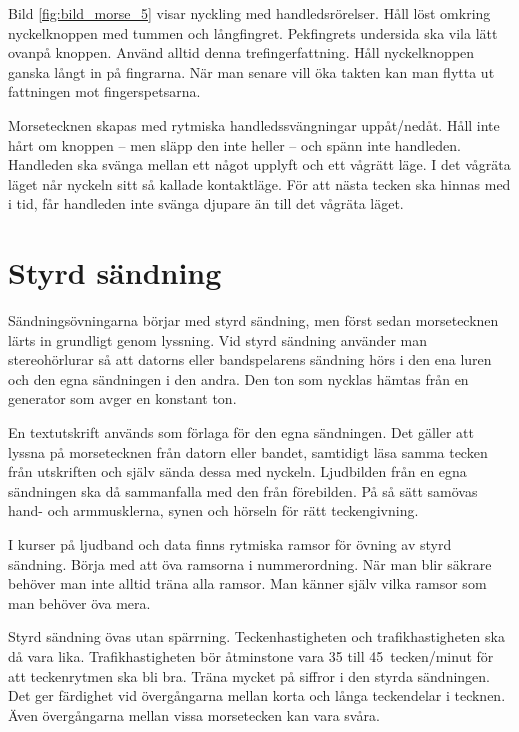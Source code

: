   
Bild \ref{fig:bild_morse_5} visar nyckling med handledsrörelser.
Håll löst omkring nyckelknoppen med tummen och långfingret.
Pekfingrets undersida ska vila lätt ovanpå knoppen.
Använd alltid denna trefingerfattning.
Håll nyckelknoppen ganska långt in på fingrarna.
När man senare vill öka takten kan man flytta ut fattningen mot fingerspetsarna.

Morsetecknen skapas med rytmiska handledssvängningar uppåt/nedåt.
Håll inte hårt om knoppen -- men släpp den inte heller -- och spänn inte
handleden.
Handleden ska svänga mellan ett något upplyft och ett vågrätt läge.
I det vågräta läget når nyckeln sitt så kallade kontaktläge.
För att nästa tecken ska hinnas med i tid, får handleden inte svänga djupare än
till det vågräta läget.

\section{Styrd sändning}

Sändningsövningarna börjar med styrd sändning, men först sedan morsetecknen
lärts in grundligt genom lyssning.
Vid styrd sändning använder man stereohörlurar så att datorns eller
bandspelarens sändning hörs i den ena luren och den egna sändningen i den andra.
Den ton som nycklas hämtas från en generator som avger en konstant ton.

En textutskrift används som förlaga för den egna sändningen.
Det gäller att lyssna på morsetecknen från datorn eller bandet, samtidigt läsa
samma tecken från utskriften och själv sända dessa med nyckeln.
Ljudbilden från en egna sändningen ska då sammanfalla med den från förebilden.
På så sätt samövas hand- och armmusklerna, synen och hörseln för rätt
teckengivning.

I kurser på ljudband och data finns rytmiska ramsor för övning av styrd
sändning.
Börja med att öva ramsorna i nummerordning.
När man blir säkrare behöver man inte alltid träna alla ramsor.
Man känner själv vilka ramsor som man behöver öva mera.

Styrd sändning övas utan spärrning.
Teckenhastigheten och trafikhastigheten ska då vara lika.
Trafikhastigheten bör åtminstone vara 35 till 45~tecken/minut för att
teckenrytmen ska bli bra.
Träna mycket på siffror i den styrda sändningen.
Det ger färdighet vid övergångarna mellan korta och långa teckendelar i tecknen.
Även övergångarna mellan vissa morsetecken kan vara svåra.

